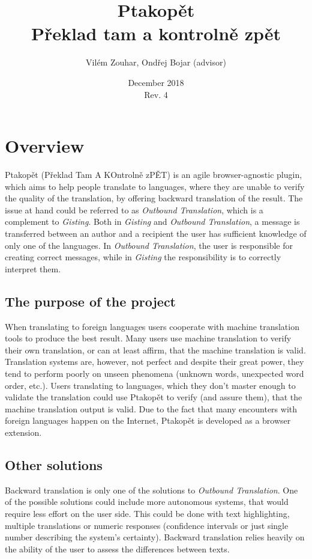 \documentclass[a4paper]{article}
\begin{document}
\title{Ptakopět \\ \large Překlad tam a kontrolně zpět }
\author{Vilém Zouhar, Ondřej Bojar \small{(advisor)}}
\date{December 2018 \\ Rev. 4}
\maketitle 

\section{Overview}
Ptakopět (Překlad Tam A KOntrolně zPĚT) is an agile browser-agnostic plugin, which aims to help people translate to languages, where they are unable to verify the quality of the translation, by offering backward translation of the result. The issue at hand could be referred to as \textit{Outbound Translation}, which is a complement to \textit{Gisting}. Both in \textit{Gisting} and \textit{Outbound Translation}, a message is transferred between an author and a recipient the user has sufficient knowledge of only one of the languages. In \textit{Outbound Translation}, the user is responsible for creating correct messages, while in \textit{Gisting} the responsibility is to correctly interpret them. 

\subsection{The purpose of the project}
When translating to foreign languages users cooperate with machine translation tools to produce the best result. Many users use machine translation to verify their own translation, or can at least affirm, that the machine translation is valid. Translation systems are, however, not perfect and despite their great power, they tend to perform poorly on unseen phenomena (unknown words, unexpected word order, etc.). Users translating to languages, which they don't master enough to validate the translation could use Ptakopět to verify (and assure them), that the machine translation output is valid. Due to the fact that many encounters with foreign languages happen on the Internet, Ptakopět is developed as a browser extension.

\subsection{Other solutions}
Backward translation is only one of the solutions to \textit{Outbound Translation}. One of the possible solutions could include more autonomous systems, that would require less effort on the user side. This could be done with text highlighting, multiple translations or numeric responses (confidence intervals or just single number describing the system's certainty). Backward translation relies heavily on the ability of the user to assess the differences between texts.
\end{document}
